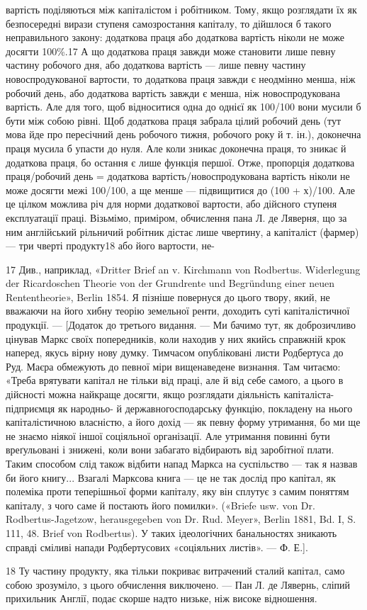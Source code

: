 вартість поділяються між капіталістом і робітником. Тому, якщо
розглядати їх як безпосередні вирази ступеня самозростання
капіталу, то дійшлося б такого неправильного закону: додаткова
праця або додаткова вартість ніколи не може досягти 100\%.17
А що додаткова праця завжди може становити лише певну частину
робочого дня, або додаткова вартість — лише певну частину
новоспродукованої вартости, то додаткова праця завжди є неодмінно
менша, ніж робочий день, або додаткова вартість завжди
є менша, ніж новоспродукована вартість. Але для того, щоб
відноситися одна до однієї як 100/100 вони мусили б бути між собою
рівні. Щоб додаткова праця забрала цілий робочий день (тут
мова йде про пересічний день робочого тижня, робочого року
й т. ін.), доконечна праця мусила б упасти до нуля. Але коли
зникає доконечна праця, то зникає й додаткова праця, бо остання
є лише функція першої. Отже, пропорція додаткова праця/робочий день =
додаткова вартість/новоспродукована вартість ніколи не може досягти межі
100/100, а ще менше — підвищитися до (100 + х)/100. Але це цілком можлива річ
для норми додаткової вартости, або дійсного ступеня експлуатації
праці. Візьмімо, приміром, обчислення пана Л. де Ляверня,
що за ним англійський рільничий робітник дістає лише чвертину,
а капіталіст (фармер) — три чверті продукту18 або його вартости, не-

17 Див., наприклад, «Dritter Brief an v. Kirchmann von Rodbertus.
Widerlegung der Ricardoschen Theorie von der Grundrente und Begründung
einer neuen Rententheorie», Berlin 1854. Я пізніше повернуся
до цього твору, який, не вважаючи на його хибну теорію земельної ренти,
доходить суті капіталістичної продукції. — [Додаток до третього видання.
— Ми бачимо тут, як доброзичливо цінував Маркс своїх попередників,
коли находив у них якийсь справжній крок наперед, якусь вірну
нову думку. Тимчасом опубліковані листи Родбертуса до Руд. Маєра
обмежують до певної міри вищенаведене визнання. Там читаємо: «Треба
врятувати капітал не тільки від праці, але й від себе самого, а цього в
дійсності можна найкраще досягти, якщо розглядати діяльність капіталіста-підприємця як народньо- й
державногосподарську функцію,
покладену на нього капіталістичною власністю, а його дохід — як певну
форму утримання, бо ми ще не знаємо ніякої іншої соціяльної організації.
Але утримання повинні бути вреґульовані і знижені, коли вони
забагато відбирають від заробітної плати. Таким способом слід також
відбити напад Маркса на суспільство — так я назвав би його книгу...
Взагалі Марксова книга — це не так дослід про капітал, як полеміка
проти теперішньої форми капіталу, яку він сплутує з самим поняттям
капіталу, з чого саме й постають його помилки». («Briefe usw. von Dr.
Rodbertus-Jagetzow, herausgegeben von Dr. Rud. Meyer», Berlin 1881,
Bd. I, S. 111, 48. Brief von Rodbertus). У таких ідеологічних банальностях
зникають справді сміливі напади Родбертусових «соціяльних листів».
— Ф. Е.].

18 Ту частину продукту, яка тільки покриває витрачений сталий
капітал, само собою зрозуміло, з цього обчислення виключено. — Пан
Л. де Лявернь, сліпий прихильник Англії, подає скорше надто низьке,
ніж високе відношення.

